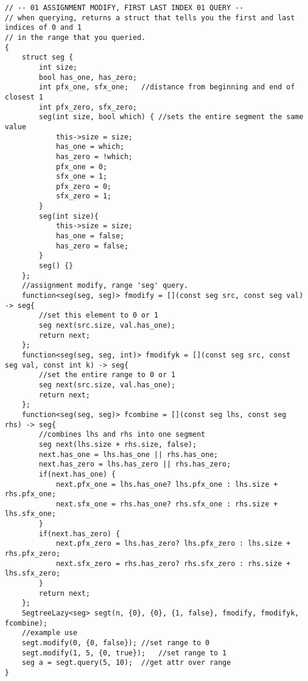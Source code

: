 \documentclass[8pt, headheight=10pt]{scrartcl}
\begin{document}
\begin{multicols*}{3}
\begin{lstlisting}
// -- 01 ASSIGNMENT MODIFY, FIRST LAST INDEX 01 QUERY -- 
// when querying, returns a struct that tells you the first and last indices of 0 and 1
// in the range that you queried. 
{
    struct seg {
        int size;
        bool has_one, has_zero;
        int pfx_one, sfx_one;   //distance from beginning and end of closest 1
        int pfx_zero, sfx_zero; 
        seg(int size, bool which) { //sets the entire segment the same value
            this->size = size;
            has_one = which;
            has_zero = !which;
            pfx_one = 0;
            sfx_one = 1;
            pfx_zero = 0;
            sfx_zero = 1;
        }
        seg(int size){
            this->size = size;
            has_one = false;
            has_zero = false;
        }
        seg() {}
    };
    //assignment modify, range 'seg' query. 
    function<seg(seg, seg)> fmodify = [](const seg src, const seg val) -> seg{
        //set this element to 0 or 1
        seg next(src.size, val.has_one);
        return next;
    };
    function<seg(seg, seg, int)> fmodifyk = [](const seg src, const seg val, const int k) -> seg{
        //set the entire range to 0 or 1
        seg next(src.size, val.has_one);
        return next;
    };
    function<seg(seg, seg)> fcombine = [](const seg lhs, const seg rhs) -> seg{
        //combines lhs and rhs into one segment
        seg next(lhs.size + rhs.size, false);
        next.has_one = lhs.has_one || rhs.has_one;
        next.has_zero = lhs.has_zero || rhs.has_zero;
        if(next.has_one) {
            next.pfx_one = lhs.has_one? lhs.pfx_one : lhs.size + rhs.pfx_one;
            next.sfx_one = rhs.has_one? rhs.sfx_one : rhs.size + lhs.sfx_one;
        }
        if(next.has_zero) {
            next.pfx_zero = lhs.has_zero? lhs.pfx_zero : lhs.size + rhs.pfx_zero;
            next.sfx_zero = rhs.has_zero? rhs.sfx_zero : rhs.size + lhs.sfx_zero;
        }
        return next;
    };
    SegtreeLazy<seg> segt(n, {0}, {0}, {1, false}, fmodify, fmodifyk, fcombine);
    //example use
    segt.modify(0, {0, false}); //set range to 0
    segt.modify(1, 5, {0, true});   //set range to 1
    seg a = segt.query(5, 10);  //get attr over range
}
\end{lstlisting}


\end{multicols*}
\end{document}
